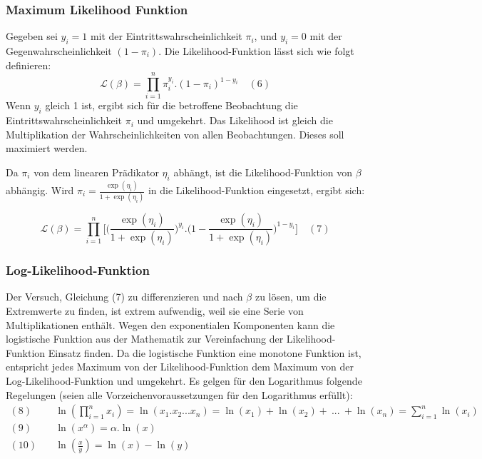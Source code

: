 \documentclass[12pt,]{article}
\begin{document}
\subsubsection{Maximum Likelihood
Funktion}\label{maximum-likelihood-funktion}

Gegeben sei \(y_i = 1\) mit der Eintrittswahrscheinlichkeit \(\pi_i\),
und \(y_i = 0\) mit der Gegenwahrscheinlichkeit \((1-\pi_i)\). Die
Likelihood-Funktion lässt sich wie folgt definieren: \[
\mathcal{L}(\beta) = {\prod_{i=1}^{n} \pi_i^{y_i}.(1-\pi_i)^{1-y_i}} \quad (6)
\] Wenn \(y_i\) gleich 1 ist, ergibt sich für die betroffene Beobachtung
die Eintrittswahrscheinlichkeit \(\pi_i\) und umgekehrt. Das Likelihood
ist gleich die Multiplikation der Wahrscheinlichkeiten von allen
Beobachtungen. Dieses soll maximiert werden.

Da \(\pi_i\) von dem linearen Prädikator \(\eta_i\) abhängt, ist die
Likelihood-Funktion von \(\beta\) abhängig. Wird
\(\pi_i = \frac{\exp(\eta_i)}{1 + \exp(\eta_i)}\) in die
Likelihood-Funktion eingesetzt, ergibt sich:

\[
\mathcal{L}(\beta) = {\prod_{i=1}^{n} \Bigg[ \Big( \frac{\exp(\eta_i)}{1 + \exp(\eta_i)} \Big)^{y_i}.\Big(1-\frac{\exp(\eta_i)}{1 + \exp(\eta_i)}\Big)^{1-y_i}}\Bigg] \quad (7)
\]

\subsubsection{Log-Likelihood-Funktion}\label{log-likelihood-funktion}

Der Versuch, Gleichung (7) zu differenzieren und nach \(\beta\) zu
lösen, um die Extremwerte zu finden, ist extrem aufwendig, weil sie eine
Serie von Multiplikationen enthält. Wegen den exponentialen Komponenten
kann die logistische Funktion aus der Mathematik zur Vereinfachung der
Likelihood-Funktion Einsatz finden. Da die logistische Funktion eine
monotone Funktion ist, entspricht jedes Maximum von der
Likelihood-Funktion dem Maximum von der Log-Likelihood-Funktion und
umgekehrt. Es gelgen für den Logarithmus folgende Regelungen (seien alle
Vorzeichenvoraussetzungen für den Logarithmus erfüllt): \[
\begin{aligned}
(8) \quad &\ln(\prod_{i=1}^{n}x_i) = \ln(x_1.x_2...x_n) = \ln(x_1) + \ln(x_2) + \ ... \ + \ln(x_n) = \sum_{i=1}^{n} \ln(x_i) \\
(9) \quad &\ln(x^\alpha) = \alpha.\ln(x) \\
(10) \quad &\ln(\frac{x}{y}) = \ln(x) - \ln(y)
\end{aligned} 
\]
\end{document}
